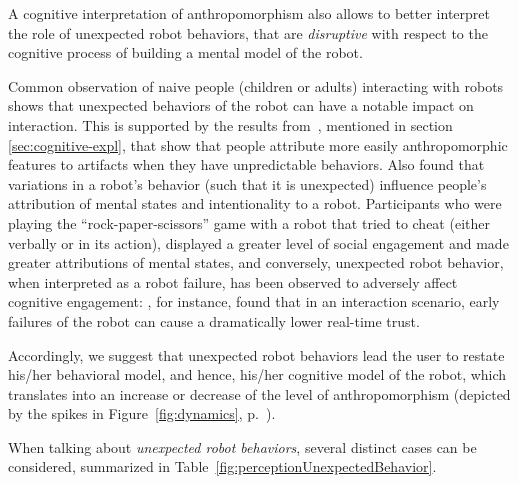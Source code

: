 \documentclass{frontiersSCNS} %
\begin{document}
A cognitive interpretation of anthropomorphism also allows to better interpret
the role of unexpected robot behaviors, that are \emph{disruptive} with respect
to the cognitive process of building a mental model of the robot.

Common observation of naive people (children or adults) interacting with robots
shows that unexpected behaviors of the robot can have a notable impact on
interaction. This is supported by the results from~\citet{Waytz2010}, mentioned
in section \ref{sec:cognitive-expl}, that show that people attribute more easily
anthropomorphic features to artifacts when they have unpredictable behaviors.
Also \cite{short_no_2010} found that variations in a robot's behavior (such that
it is unexpected) influence people's attribution of mental states and
intentionality to a robot. Participants who were playing the
``rock-paper-scissors'' game with a robot that tried to cheat (either verbally
or in its action), displayed a greater level of social engagement and made
greater attributions of mental states, and conversely, unexpected robot
behavior, when interpreted as a robot failure, has been observed to adversely
affect cognitive engagement: \cite{desai_impact_2013}, for instance, found that
in an interaction scenario, early failures of the robot can cause a dramatically
lower real-time trust.

Accordingly, we suggest that unexpected robot behaviors lead the user to restate
his/her behavioral model, and hence, his/her cognitive model of the robot, which
translates into an increase or decrease of the level of anthropomorphism
(depicted by the spikes in Figure~\ref{fig:dynamics}, p.~\pageref{fig:dynamics}).

When talking about \emph{unexpected robot behaviors}, several distinct cases can
be considered, summarized in Table~\ref{fig:perceptionUnexpectedBehavior}.
\end{document}
